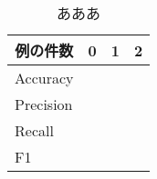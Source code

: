 \begin{table}[H]
\centering
\caption{あああ}
\begin{tabular}{|l||l|l|l|}
\hline
\multicolumn{1}{|c||}{例の件数} & \multicolumn{1}{c|}{0} & \multicolumn{1}{c|}{1} & \multicolumn{1}{c|}{2} \\ \hline
Accuracy    & & &\\ \hline
Precision   & & &\\ \hline
Recall      & & &\\ \hline
F1          & & &\\ \hline
\end{tabular}
\label{spoken-book}
\end{table}